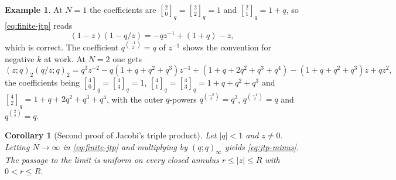 \documentclass[11pt,oneside,openany]{book}
\newtheorem{corollary}[corollary]{Corollary}
\theoremstyle{definition}
\newtheorem{example}[example]{Example}
\theoremstyle{remark}
\newcommand{\qbinom}[2]{\genfrac{[}{]}{0pt}{}{#1}{#2}_{q}}
\newcommand{\Q}{\mathbb Q}
\newcommand{\abs}[1]{\lvert #1\rvert}
\begin{document}
\begin{example}\label{ex:finite-jtp-N1}
At $N=1$ the coefficients are $\qbinom20=\qbinom22=1$ and $\qbinom21=1+q$, so \eqref{eq:finite-jtp} reads
\[
 (1-z)(1-q/z)=-q z^{-1}+(1+q)-z,
\]
which is correct.  The coefficient $q^{\binom{-1}{2}}=q$ of $z^{-1}$ shows the convention for negative $k$ at work.  At $N=2$ one gets
\[
 (z;q)_2(q/z;q)_2
 =q^{3}z^{-2}-q(1+q+q^{2}+q^{3})z^{-1}
 +(1+q+2q^{2}+q^{3}+q^{4})
 -(1+q+q^{2}+q^{3})z+qz^{2},
\]
the coefficients being $\qbinom40=\qbinom44=1$,
$\qbinom41=\qbinom43=1+q+q^2+q^3$ and
$\qbinom42=1+q+2q^2+q^3+q^4$, with the outer $q$-powers
$q^{\binom{-2}{2}}=q^{3}$, $q^{\binom{-1}{2}}=q$ and $q^{\binom22}=q$.
\end{example}

\begin{corollary}[Second proof of Jacobi's triple product]\label{cor:jtp-from-finite}
Let $\abs q<1$ and $z\ne0$.  Letting $N\to\infty$ in \eqref{eq:finite-jtp} and multiplying by $(q;q)_\infty$ yields \eqref{eq:jtp-minus}.  The passage to the limit is uniform on every closed annulus $r\le\abs z\le R$ with $0<r\le R$.
\end{corollary}
\end{document}
